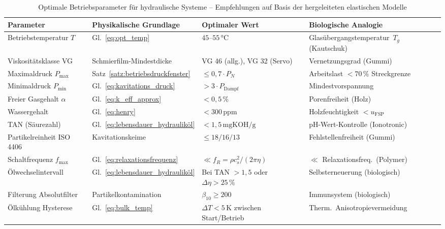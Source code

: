 ﻿\documentclass[a4paper,12pt]{scrreprt}
\theoremstyle{definition}
\begin{document}
\begin{table}[H]
  \centering
  \caption{Optimale Betriebsparameter für hydraulische Systeme -- Empfehlungen
    auf Basis der hergeleiteten elastischen Modelle}
  \label{tab:optimale_parameter}
  \begin{tabular}{p{4.5cm}p{3.5cm}p{3.0cm}p{2.5cm}}
    \toprule
    \textbf{Parameter}
      & \textbf{Physikalische Grundlage}
      & \textbf{Optimaler Wert}
      & \textbf{Biologische Analogie} \\
    \midrule
    Betriebstemperatur $T$
      & Gl.~\eqref{eq:opt_temp}
      & $45$--$55\, °\mathrm{C}$
      & Glasübergangs\-temperatur\ $T_g$ (Kautschuk) \\[4pt]
    Viskositätsklasse VG
      & Schmierfilm-Mindestdicke
      & VG 46 (allg.), VG 32 (Servo)
      & Vernetzungsgrad (Gummi) \\[4pt]
    Maximaldruck $P_{\max}$
      & Satz~\ref{satz:betriebsdruckfenster}
      & $\leq 0{,}7 \cdot P_N$
      & Arbeitslast $< 70\,\%$ Streckgrenze \\[4pt]
    Minimaldruck $P_{\min}$
      & Gl.~\eqref{eq:kavitations_druck}
      & $> 3 \cdot P_{\mathrm{Dampf}}$
      & Mindestvorspan\-nung \\[4pt]
    Freier Gasgehalt $\alpha$
      & Gl.~\eqref{eq:k_eff_approx}
      & $< 0{,}5\,\%$
      & Porenfreiheit (Holz) \\[4pt]
    Wassergehalt
      & Gl.~\eqref{eq:henry}
      & $< 300\,\mathrm{ppm}$
      & Holzfeuchtigkeit $< u_{\mathrm{FSP}}$ \\[4pt]
    TAN (Säurezahl)
      & Gl.~\eqref{eq:lebensdauer_hydrauliköl}
      & $< 1{,}5\,\mathrm{mgKOH/g}$
      & pH-Wert-Kontrolle (Ionotronic) \\[4pt]
    Partikelreinheit ISO 4406
      & Kavitationskeime
      & $\leq 18/16/13$
      & Fehlstellenfreiheit (Gummi) \\[4pt]
    Schaltfrequenz $f_{\max}$
      & Gl.~\eqref{eq:relaxationsfrequenz}
      & $\ll f_R = \rho c_s^2 / (2\pi\eta)$
      & $\ll$ Relaxationsfreq.\ (Polymer) \\[4pt]
    Ölwechselintervall
      & Gl.~\eqref{eq:lebensdauer_hydrauliköl}
      & Bei TAN $> 1{,}5$ oder $\Delta\eta > 25\,\%$
      & Selbsterneuerung (biologisch) \\[4pt]
    Filterung Absolutfilter
      & Partikelkontamination
      & $\beta_{10} \geq 200$
      & Immunsystem (biologisch) \\[4pt]
    Ölkühlung Hysterese
      & Gl.~\eqref{eq:bulk_temp}
      & $\Delta T < 5\,\mathrm{K}$ zwischen Start/Betrieb
      & Therm.\ Anisotropievermeidung \\
    \bottomrule
  \end{tabular}
\end{table}
\end{document}
